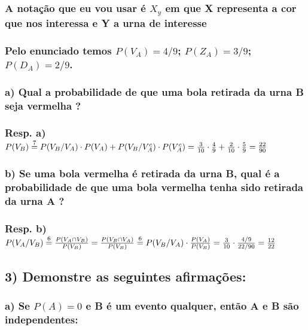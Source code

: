 \documentclass[portuguese]{article}
\begin{document}
\subsubsection*{\textmd{A notação que eu vou usar é $X_{y}$ em que X representa
a cor que nos interessa e Y a urna de interesse}}


\subsubsection*{\textmd{Pelo enunciado temos $P(V_{A})=4/9$; $P(Z_{A})=3/9$; $P(D_{A})=2/9$. }}


\subsubsection*{\textmd{a) Qual a probabilidade de que uma bola retirada da urna
B seja vermelha ?}}


\subsubsection*{\textmd{Resp. a) $P(V_{B})\protect\overset{7}{=}P(V_{B}/V_{A})\cdot P(V_{A})+P(V_{B}/V_{A}^{c})\cdot P(V_{A}^{c})=\frac{3}{10}\cdot\frac{4}{9}+\frac{2}{10}\cdot\frac{5}{9}=\frac{22}{90}$}}


\subsubsection*{\textmd{b) Se uma bola vermelha é retirada da urna B, qual é a probabilidade
de que uma bola vermelha tenha sido retirada da urna A ?}}


\subsubsection*{\textmd{Resp. b) $P(V_{A}/V_{B})\protect\overset{6}{=}\frac{P(V_{A}\cap V_{B})}{P(V_{B})}=\frac{P(V_{B}\cap V_{A})}{P(V_{B})}\protect\overset{6}{=}P(V_{B}/V_{A})\cdot\frac{P(V_{A})}{P(V_{B})}=\frac{3}{10}\cdot\frac{4/9}{22/90}=\frac{12}{22}$}}

\textcompwordmark{}


\subsection*{\textmd{3) Demonstre as seguintes afirmações:}}


\subsubsection*{\textmd{a) Se $P(A)=0$ e B é um evento qualquer, então A e B são
independentes:}}
\end{document}

